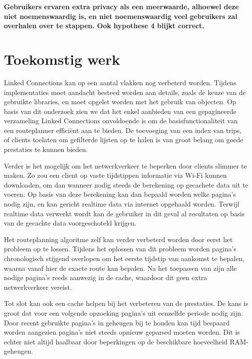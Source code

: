 	\textbf{Gebruikers ervaren extra privacy als een meerwaarde, alhoewel deze niet noemenswaardig is, en niet noemenswaardig veel gebruikers zal overhalen over te stappen. Ook hypothese 4 blijkt correct.}
	
\section{Toekomstig werk}
\label{sec:futurework}
Linked Connections kan op een aantal vlakken nog verbeterd worden. Tijdens implementaties moet aandacht besteed worden aan details, zoals de keuze van de gebruikte libraries, en moet opgelet worden met het gebruik van  objecten. Op basis van dit onderzoek zien we dat het enkel aanbieden van een gepagineerde verzameling Linked Connections onvoldoende is om de basisfunctionaliteit van een routeplanner efficiënt aan te bieden. De toevoeging van een index van trips, of clients toelaten om gefilterde lijsten op te halen is van groot belang om goede prestaties te kunnen bieden.

Verder is het mogelijk om het netwerkverkeer te beperken door clients slimmer te maken. Zo zou een client op vaste tijdstippen informatie via Wi-Fi kunnen downloaden, om dan wanneer nodig steeds de berekening op gecachete data uit te voeren. Op basis van deze berekening kan dan bepaald worden welke pagina's nodig zijn, en kan gericht realtime data via internet opgehaald worden. Terwijl realtime data verwerkt wordt kan de gebruiker in dit geval al resultaten op basis van de gecachte data voorgeschoteld krijgen.

Het routeplanning algoritme zelf kan verder verbeterd worden door eerst het  probleem op te lossen. Tijdens het oplossen van dit probleem worden pagina's chronologisch stijgend overlopen om het eerste tijdstip van aankomst te bepalen, waarna  vanaf hier de exacte route kan bepalen. Na het toepassen van  zijn alle nodige pagina's reeds aanwezig in de cache, waardoor dit geen extra netwerkverkeer vereist.

Tot slot kan ook een  cache helpen bij het verbeteren van de prestaties. De kans is groot dat voor een volgende opzoeking pagina's uit eenzelfde periode nodig zijn. Door recent gebruikte pagina's in geheugen bij te houden kan tijd bespaard worden aangezien pagina's niet steeds opnieuw geparsed moeten worden. Dit is echter niet altijd haalbaar door beperkingen op de beschikbare hoeveelheid RAM-geheugen.

